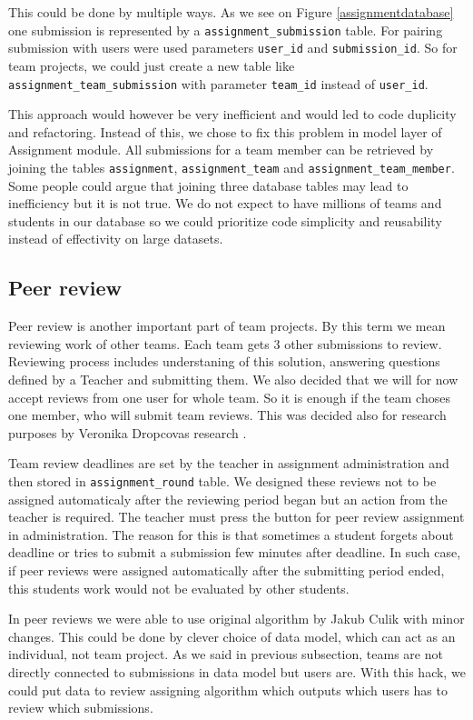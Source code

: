 This could be done by multiple ways. As we see on Figure \ref{assignmentdatabase} one submission is represented by a \texttt{assignment\_submission} table. For pairing submission with users were used parameters \texttt{user\_id} and \texttt{submission\_id}. So for team projects, we could just create a new table like \texttt{assignment\_team\_submission} with parameter \texttt{team\_id} instead of \texttt{user\_id}.

This approach would however be very inefficient and would led to code duplicity and refactoring. Instead of this, we chose to fix this problem in model layer of Assignment module. All submissions for a team member can be retrieved by joining the tables  \texttt{assignment}, \texttt{assignment\_team} and \texttt{assignment\_team\_member}. Some people could argue that joining three database tables may lead to inefficiency but it is not true. We do not expect to have millions of teams and students in our database so we could prioritize code simplicity and reusability instead of effectivity on large datasets.

\subsection{Peer review}
\label{sec:peerreview}
Peer review is another important part of team projects. By this term we mean reviewing work of other teams. Each team gets 3 other submissions to review. Reviewing process includes understaning of this solution, answering questions defined by a Teacher and submitting them. We also decided that we will for now accept reviews from one user for whole team. So it is enough if the team choses one member, who will submit team reviews. This was decided also for research purposes by Veronika Dropcovas research \cite{dropcova}. 

Team review deadlines are set by the teacher in assignment administration and then stored in \texttt{assignment\_round} table. We designed these reviews not to be assigned automaticaly after the reviewing period began but an action from the teacher is required. The teacher must press the button for peer review assignment in administration. The reason for this is that sometimes a student forgets about deadline or tries to submit a submission few minutes after deadline. In such case, if peer reviews were assigned automatically after the submitting period ended, this students work would not be evaluated by other students.

In peer reviews we were able to use original algorithm by Jakub Culik \cite{culik} with minor changes. This could be done by clever choice of data model, which can act as an individual, not team project. As we said in previous subsection, teams are not directly connected to submissions in data model but users are. With this hack, we could put data to review assigning algorithm which outputs which users has to review which submissions.

